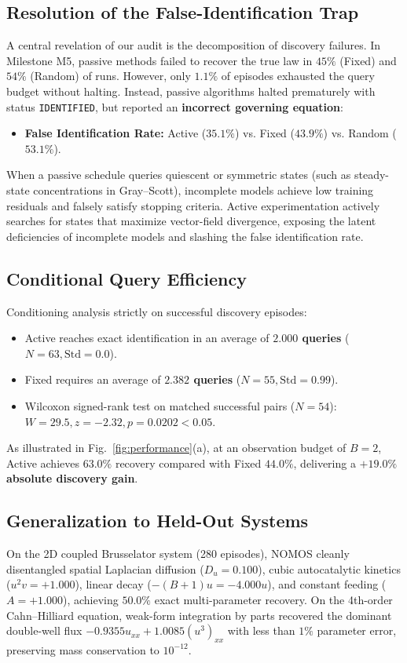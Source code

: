 \documentclass[twocolumn,10pt,a4paper]{article}
\begin{document}
\subsection{Resolution of the False-Identification Trap}
A central revelation of our audit is the decomposition of discovery failures. In Milestone M5, passive methods failed to recover the true law in $45\%$ (Fixed) and $54\%$ (Random) of runs. However, only $1.1\%$ of episodes exhausted the query budget without halting.
Instead, passive algorithms halted prematurely with status \texttt{IDENTIFIED}, but reported an \textbf{incorrect governing equation}:
\begin{itemize}
    \item \textbf{False Identification Rate:} Active ($35.1\%$) vs. Fixed ($43.9\%$) vs. Random ($53.1\%$).
\end{itemize}
When a passive schedule queries quiescent or symmetric states (such as steady-state concentrations in Gray--Scott), incomplete models achieve low training residuals and falsely satisfy stopping criteria. Active experimentation actively searches for states that maximize vector-field divergence, exposing the latent deficiencies of incomplete models and slashing the false identification rate.

\subsection{Conditional Query Efficiency}
Conditioning analysis strictly on successful discovery episodes:
\begin{itemize}
    \item Active reaches exact identification in an average of \textbf{$2.000$ queries} ($N=63, \text{Std}=0.0$).
    \item Fixed requires an average of \textbf{$2.382$ queries} ($N=55, \text{Std}=0.99$).
    \item Wilcoxon signed-rank test on matched successful pairs ($N=54$): $W = 29.5, z = -2.32, p = \mathbf{0.0202} < 0.05$.
\end{itemize}
As illustrated in Fig.~\ref{fig:performance}(a), at an observation budget of $B=2$, Active achieves $63.0\%$ recovery compared with Fixed $44.0\%$, delivering a \textbf{$+19.0\%$ absolute discovery gain}.

\subsection{Generalization to Held-Out Systems}
On the 2D coupled Brusselator system (280 episodes), NOMOS cleanly disentangled spatial Laplacian diffusion ($D_u = 0.100$), cubic autocatalytic kinetics ($u^2 v = +1.000$), linear decay ($-(B+1)u = -4.000 u$), and constant feeding ($A = +1.000$), achieving $50.0\%$ exact multi-parameter recovery. On the 4th-order Cahn--Hilliard equation, weak-form integration by parts recovered the dominant double-well flux $-0.9355 u_{xx} + 1.0085 (u^3)_{xx}$ with less than $1\%$ parameter error, preserving mass conservation to $10^{-12}$.
\end{document}
